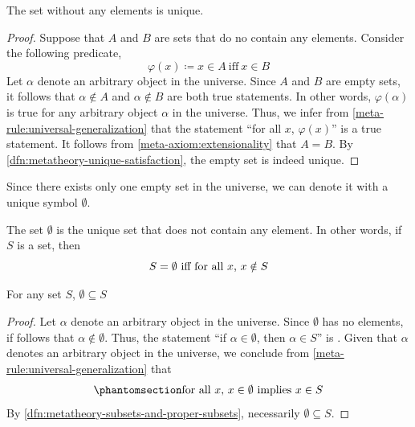 \begin{thm}
     \label{thm:metatheory-uniqueness-of-empty-set}
    The set without any elements is unique.
\end{thm}

\begin{proof}
    Suppose that \( A \) and \( B \) are sets that do no contain any elements.
    Consider the following predicate,
    \begin{equation*}
        \varphi(x) \coloneq x \in A \ \text{iff}\  x \in B
    \end{equation*}
    Let \( \alpha \) denote an arbitrary object in the universe.
    Since \( A \) and \( B \) are empty sets, it follows that
    \( \alpha \notin A \) and \( \alpha \notin B \) are both true statements.
    In other words, \( \varphi(\alpha) \) is true for any arbitrary object \( \alpha \) in the universe.
    Thus, we infer from \cref{meta-rule:universal-generalization} that the statement ``for all \( x \), \( \varphi(x) \)'' is a true statement.
    It follows from \cref{meta-axiom:extensionality} that \( A = B \).
    By \cref{dfn:metatheory-unique-satisfaction}, the empty set is indeed unique.
\end{proof}

\begin{notation}
    Since there exists only one empty set in the universe, we can denote it with a unique symbol \( \emptyset \).
\end{notation}

\begin{dfn}
     \label{dfn:metatheory-empty-set}
    The set \( \emptyset \) is the unique set that does not contain any element.
    In other words, if \( S \) is a set, then
    \begin{equation*}
        \text{\( S = \emptyset \) iff for all \( x \), \( x \notin S \)}
    \end{equation*}
\end{dfn}

\begin{thm}
     \label{thm:metatheory-empty-set-is-the-subset-of-every-set}
    For any set \( S \), \( \emptyset \subseteq S \)
\end{thm}

\begin{proof}
    Let \( \alpha \) denote an arbitrary object in the universe.
    Since \( \emptyset \) has no elements, if follows that \( \alpha \notin \emptyset \).
    Thus, the statement ``if \( \alpha \in \emptyset \), then \( \alpha \in S \)'' is .
    Given that \( \alpha \) denotes an arbitrary object in the universe, we conclude from \cref{meta-rule:universal-generalization} that
    \begin{equation}
        \phantomsection \label{eq:S-is-subset-of-empty-set}
        \text{for all \( x \), \( x \in \emptyset \) implies \( x \in S \)}
    \end{equation}
    By \cref{dfn:metatheory-subsets-and-proper-subsets}, necessarily \( \emptyset \subseteq S \).
\end{proof}

